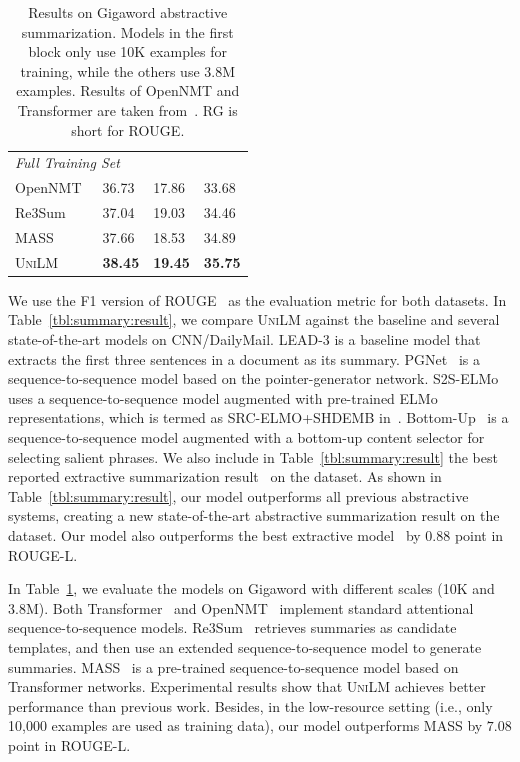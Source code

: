 \documentclass{article}
\newcommand\ours{\textsc{UniLM}}
\begin{document}
\begin{table}[t]
\begin{minipage}{2.7in}
\begin{tabular}{@{\hskip6pt}l@{\hskip6pt} @{\hskip6pt}l@{\hskip6pt} @{\hskip6pt}l@{\hskip6pt} @{\hskip6pt}l@{\hskip6pt}}
\midrule
\multicolumn{4}{l}{\emph{Full Training Set}} \\
\quad OpenNMT~\cite{opennmt}   & 36.73 & 17.86 & 33.68  \\
\quad Re3Sum~\cite{re3sum}   & 37.04 & 19.03 & 34.46 \\
\quad MASS~\cite{mass}   & 37.66 & 18.53 & 34.89 \\
\quad \ours & \textbf{38.45} & \textbf{19.45} & \textbf{35.75} \\
\bottomrule
\end{tabular}
\normalsize
\caption{Results on Gigaword abstractive summarization. Models in the first block only use 10K examples for training, while the others use 3.8M examples. Results of OpenNMT and Transformer are taken from~\cite{re3sum,mass}. RG is short for ROUGE.}
\label{tbl:summary:gigaword}
\end{minipage}
\end{table}

We use the F1 version of ROUGE~\cite{lin-2004-rouge} as the evaluation metric for both datasets.
In Table~\ref{tbl:summary:result}, we compare \ours{} against the baseline and several state-of-the-art models on CNN/DailyMail.
LEAD-3 is a baseline model that extracts the first three sentences in a document as its summary.
PGNet~\cite{see-etal-2017-get} is a sequence-to-sequence model based on the pointer-generator network.
S2S-ELMo~\cite{Edunov2019PretrainedLM} uses a sequence-to-sequence model augmented with pre-trained ELMo representations, which is termed as SRC-ELMO+SHDEMB in~\cite{Edunov2019PretrainedLM}.
Bottom-Up~\cite{gehrmann-etal-2018-bottom} is a sequence-to-sequence model augmented with a bottom-up content selector for selecting salient phrases.
We also include in Table~\ref{tbl:summary:result} the best reported extractive summarization result~\cite{bertsum} on the dataset.
As shown in Table~\ref{tbl:summary:result}, our model outperforms all previous abstractive systems, creating a new state-of-the-art abstractive summarization result on the dataset. Our model also outperforms the best extractive model~\cite{bertsum} by $0.88$ point in ROUGE-L.

In Table~\ref{tbl:summary:gigaword}, we evaluate the models on Gigaword with different scales (10K and 3.8M).
Both Transformer~\cite{transformer} and OpenNMT~\cite{opennmt} implement standard attentional sequence-to-sequence models.
Re3Sum~\cite{re3sum} retrieves summaries as candidate templates, and then use an extended sequence-to-sequence model to generate summaries.
MASS~\cite{mass} is a pre-trained sequence-to-sequence model based on Transformer networks.
Experimental results show that \ours{} achieves better performance than previous work.
Besides, in the low-resource setting (i.e., only 10,000 examples are used as training data), our model outperforms MASS by $7.08$ point in ROUGE-L.
\end{document}
